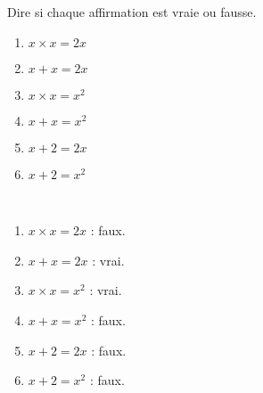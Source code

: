 \begin{exercice}
    Dire si chaque affirmation est vraie ou fausse.
    \begin{multicols}{2}
      \begin{enumerate}
         \item $x\times x = 2x$
         \item $x+x = 2x$
         \item $x\times x = x^{2}$
         \item $x+x =x^{2}$
         \item $x+2 =2x$
         \item $x+2=x^{2}$
      \end{enumerate}
   \end{multicols}
\end{exercice}
 
\begin{corrige}
 \ \\ [-5mm]
   \begin{multicols}{2}
      \begin{enumerate}
         \item $x\times x = 2x$ : {\red faux}.
         \item $x+x = 2x$ : {\red vrai}.
         \item $x\times x = x^{2}$ : {\red vrai}.
         \item $x+x =x^{2}$ : {\red faux}.
         \item $x+2 =2x$ : {\red faux}.
         \item $x+2=x^{2}$ : {\red faux}.
      \end{enumerate}
   \end{multicols}
\end{corrige}